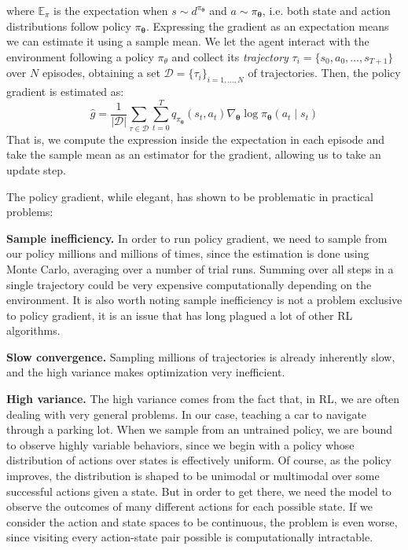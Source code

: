 where $\mathbb{E}_\pi$ is the expectation when $s \sim d^{\pi_{\boldsymbol\theta}}$ and $a \sim \pi_{\boldsymbol\theta}$, i.e. both state and action distributions follow policy $\pi_{\boldsymbol\theta}$. Expressing the gradient as an expectation means we can estimate it using a sample mean. We let the agent interact with the environment following a policy $\pi_\theta$ and collect its \textit{trajectory} $\tau_i = \{s_0, a_0, \dots, s_{T+1}\}$ over $N$ episodes, obtaining a set $\mathcal{D} = \{\tau_i\}_{i=1,\dots,N}$ of trajectories. Then, the policy gradient is estimated as:
\begin{equation}\label{pg_estimator}
    \hat{g} = \frac{1}{|\mathcal{D}|}\sum_{\tau \in \mathcal{D}} \sum_{t=0}^{T} q_{\pi_{\boldsymbol\theta}}(s_t, a_t)\nabla_{\boldsymbol\theta}\log{\pi_{\boldsymbol\theta}(a_t \mid s_t)}
\end{equation}
That is, we compute the expression inside the expectation in each episode and take the sample mean as an estimator for the gradient, allowing us to take an update step.

The policy gradient, while elegant, has shown to be problematic in practical problems:

\textbf{Sample inefficiency.} In order to run policy gradient, we need to sample from our policy millions and millions of times, since the estimation is done using Monte Carlo, averaging over a number of trial runs. Summing over all steps in a single trajectory could be very expensive computationally depending on the environment. It is also worth noting sample inefficiency is not a problem exclusive to policy gradient, it is an issue that has long plagued a lot of other RL algorithms.

\textbf{Slow convergence.} Sampling millions of trajectories is already inherently slow, and the high variance makes optimization very inefficient.

\textbf{High variance.} The high variance comes from the fact that, in RL, we are often dealing with very general problems. In our case, teaching a car to navigate through a parking lot. When we sample from an untrained policy, we are bound to observe highly variable behaviors, since we begin with a policy whose distribution of actions over states is effectively uniform. Of course, as the policy improves, the distribution is shaped to be unimodal or multimodal over some successful actions given a state. But in order to get there, we need the model to observe the outcomes of many different actions for each possible state. If we consider the action and state spaces to be continuous, the problem is even worse, since visiting every action-state pair possible is computationally intractable.

